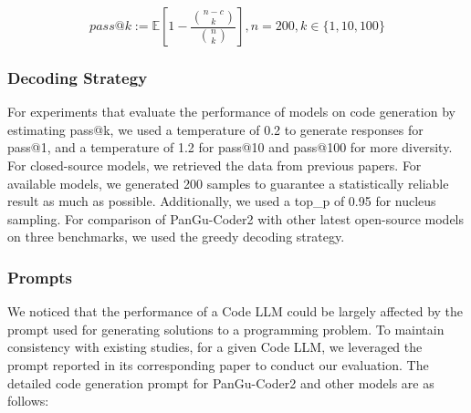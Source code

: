 \documentclass{article}
\newcommand{\pgcoder}{PanGu-Coder2\xspace}
\begin{document}
$$
pass@k := \mathbb{E}[1-\frac{{n-c \choose k}}{{n \choose k}}], n=200, k \in \{1, 10, 100\}
$$


\subsubsection{Decoding Strategy} For experiments that evaluate the performance of models on code generation by estimating pass@k, we used a temperature of 0.2 to generate responses for pass@1, and a temperature of 1.2 for pass@10 and pass@100 for more diversity. For closed-source models, we retrieved the data from previous papers. For available models, we generated 200 samples to guarantee a statistically reliable result as much as possible. Additionally, we used a top\_p of 0.95 for nucleus sampling. For comparison of \pgcoder with other latest open-source models on three benchmarks, we used the greedy decoding strategy.

\subsubsection{Prompts} We noticed that the performance of a Code LLM could be largely affected by the prompt used for generating solutions to a programming problem. To maintain consistency with existing studies, for a given Code LLM, we leveraged the prompt reported in its corresponding paper to conduct our evaluation. The detailed code generation prompt for \pgcoder and other models are as follows:
\end{document}
